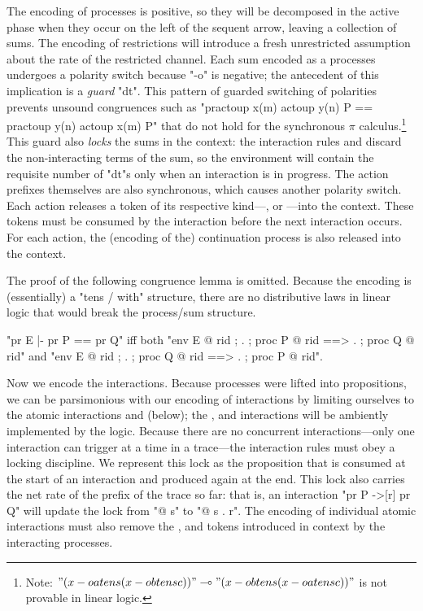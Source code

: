\documentclass{article}
\begin{document}
The encoding of processes is positive, so they will be decomposed in the active
phase when they occur on the left of the sequent arrow, leaving a collection of
sums.  The encoding of restrictions will introduce a fresh unrestricted
assumption about the rate of the restricted channel. Each sum encoded as a
processes undergoes a polarity switch because "-o" is negative; the antecedent
of this implication is a \emph{guard} "dt". This pattern of guarded switching of
polarities prevents unsound congruences such as "pr{act{oup x(m)} act{oup y(n)}
  P} == pr{act{oup y(n)} act{oup x(m)} P}" that do not hold for the synchronous
$\pi$ calculus.\footnote{Note: $"(x -o a tens (x -o b tens c))" \multimap "(x -o
  b tens (x -o a tens c))"$ is not provable in linear logic.}  This guard also
\emph{locks} the sums in the context: the \spi interaction rules  and
 discard the non-interacting terms of the sum, so the environment will
contain the requisite number of "dt"s only when an interaction is in progress.
The action prefixes themselves are also synchronous, which causes another
polarity switch. Each action releases a token of its respective kind---,
 or ---into the context. 
These tokens must be consumed by the interaction before 
the next interaction occurs.
For each action, 
the (encoding of the) continuation process is also released into the context.

The proof of the following congruence lemma is omitted. Because the encoding is
(essentially) a "tens / with" structure, there are no distributive laws in
linear logic that would break the process/sum structure.

\begin{thm}[congruence] 
  \label{thm:congr} \hfill\break
  "pr E |- pr P == pr Q" iff both "env E @ rid ; . ; proc P @ rid ==> . ; proc Q @ rid" 
  and "env E @ rid ; . ; proc Q @ rid ==> . ; proc P @ rid".
\end{thm}

Now we encode the interactions. Because processes were lifted into propositions,
we can be parsimonious with our encoding of interactions by limiting ourselves
to the atomic interactions  and  (below); the ,
 and  interactions will be ambiently implemented by the
logic. Because there are no concurrent interactions---only one interaction can
trigger at a time in a trace---the interaction rules must obey a locking
discipline. We represent this lock as the proposition \cact that is consumed at
the start of an interaction and produced again at the end. This lock also
carries the net rate of the prefix of the trace so far: that is, an interaction
"pr P ->[r] pr Q" will update the lock from "\cact @ s" to "\cact @ {s .
  r}". The encoding of individual atomic interactions must also remove the
,  and  tokens introduced in context by the interacting
processes.
\end{document}
